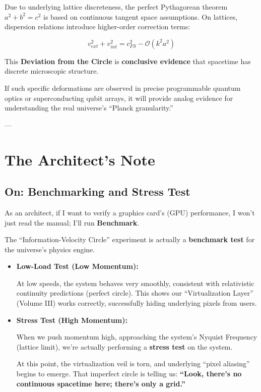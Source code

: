 \documentclass[11pt,a4paper,twoside]{book}
\begin{document}
Due to underlying lattice discreteness, the perfect Pythagorean theorem $a^2+b^2=c^2$ is based on continuous tangent space assumptions. On lattices, dispersion relations introduce higher-order correction terms:

$$v_{ext}^2 + v_{int}^2 = c_{FS}^2 - \mathcal{O}(k^2 a^2)$$

This \textbf{Deviation from the Circle} is \textbf{conclusive evidence} that spacetime has discrete microscopic structure.

If such specific deformations are observed in precise programmable quantum optics or superconducting qubit arrays, it will provide analog evidence for understanding the real universe's ``Planck granularity.''

---

\section{The Architect's Note}

\subsection{On: Benchmarking and Stress Test}

As an architect, if I want to verify a graphics card's (GPU) performance, I won't just read the manual; I'll run \textbf{Benchmark}.

The ``Information-Velocity Circle'' experiment is actually a \textbf{benchmark test} for the universe's physics engine.

\begin{itemize}
\item \textbf{Low-Load Test (Low Momentum):}

  At low speeds, the system behaves very smoothly, consistent with relativistic continuity predictions (perfect circle). This shows our ``Virtualization Layer'' (Volume III) works correctly, successfully hiding underlying pixels from users.

\item \textbf{Stress Test (High Momentum):}

  When we push momentum high, approaching the system's Nyquist Frequency (lattice limit), we're actually performing a \textbf{stress test} on the system.

  At this point, the virtualization veil is torn, and underlying ``pixel aliasing'' begins to emerge. That imperfect circle is telling us: \textbf{``Look, there's no continuous spacetime here; there's only a grid.''}
\end{itemize}
\end{document}
